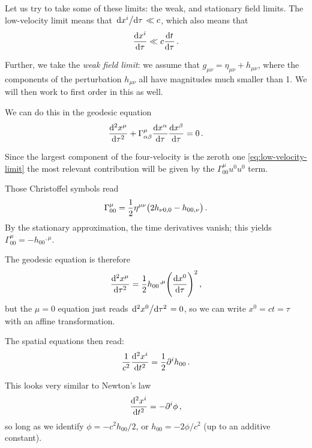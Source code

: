\documentclass[main.tex]{subfiles}
\begin{document}
Let us try to take some of these limits: the weak, and stationary field limits. 
The low-velocity limit means that \(\dv*{x^{i}}{\tau } \ll c\), which also means that 
%
\begin{align} \label{eq:low-velocity-limit}
\dv{x^{i}}{\tau } \ll c \dv{t}{\tau }
\,.
\end{align}

Further, we take the \emph{weak field limit}: we assume that \(g_{\mu \nu } = \eta_{\mu \nu } + h_{\mu \nu }\), where the components of the perturbation \(h_{\mu \nu }\) all have magnitudes much smaller than 1. 
We will then work to first order in this as well.

We can do this in the geodesic equation 
%
\begin{align}
\dv[2]{x^{\mu }}{\tau } + \Gamma^{\mu }_{\alpha \beta } \dv{x^{\alpha }}{\tau } \dv{x^{\beta }}{\tau } = 0
\,.
\end{align}

Since the largest component of the four-velocity is the zeroth one \eqref{eq:low-velocity-limit} the most relevant contribution will be given by the \(\Gamma^{\mu }_{00} u^{0} u^{0}\) term. 

Those Christoffel symbols read 
%
\begin{align}
\Gamma^{\mu }_{00} = \frac{1}{2} \eta^{\mu \nu } \qty(2 h_{\nu 0, 0} - h_{00, \nu })
\,.
\end{align}
%
By the stationary approximation, the time derivatives vanish; this yields \(\Gamma^{\mu }_{00} = - h_{00}{}^{, \mu }\).

The geodesic equation is therefore 
%
\begin{align}
\dv[2]{x^{\mu }}{\tau } = \frac{1}{2} h_{00}{}^{, \mu } \qty(\dv{x^{0}}{\tau })^2
\,,
\end{align}
%
but the \(\mu = 0\) equation just reads \(\dv*[2]{x^{0}}{\tau } = 0\), so we can write \(x^{0} = ct = \tau \) with an affine transformation. 

The spatial equations then read: 
%
\begin{align}
\frac{1}{c^2} \dv[2]{x^{i}}{t} = \frac{1}{2} \partial^{i} h_{00} 
\,.
\end{align}

This looks very similar to Newton's law 
%
\begin{align}
\dv[2]{x^{i}}{t} = - \partial^{i} \phi 
\,,
\end{align}
%
so long as we identify \(\phi = - c^2 h_{00} /2\), or \(h_{00} = -2 \phi / c^2\) (up to an additive constant). 
\end{document}
